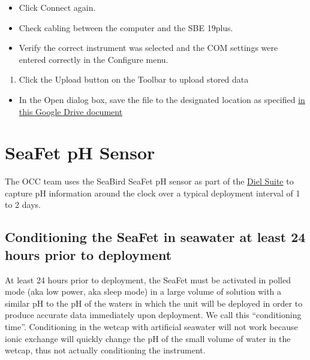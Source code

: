 \documentclass[]{book}
\providecommand{\tightlist}{%
  \setlength{\itemsep}{0pt}\setlength{\parskip}{0pt}}
\begin{document}
\begin{itemize}
\tightlist
\item
  Click Connect again.
\item
  Check cabling between the computer and the SBE 19plus.
\item
  Verify the correct instrument was selected and the COM settings were
  entered correctly in the Configure menu.
\end{itemize}

\begin{enumerate}
\def\labelenumi{\arabic{enumi}.}
\setcounter{enumi}{4}
\tightlist
\item
  Click the Upload button on the Toolbar to upload stored data
\end{enumerate}

\begin{itemize}
\tightlist
\item
  In the Open dialog box, save the file to the designated location as
  specified
  \href{https://drive.google.com/drive/folders/1WcZclgRCLHNOXykYigSZviiwFEH02lKx}{in
  this Google Drive document}
\end{itemize}

\chapter{SeaFet pH Sensor}\label{seafet-ph-sensor}

The OCC team uses the SeaBird SeaFet pH sensor as part of the
\protect\hyperlink{dielsuite}{Diel Suite} to capture pH information
around the clock over a typical deployment interval of 1 to 2 days.

\section{Conditioning the SeaFet in seawater at least 24 hours prior to
deployment}\label{conditioning-the-seafet-in-seawater-at-least-24-hours-prior-to-deployment}

At least 24 hours prior to deployment, the SeaFet must be activated in
polled mode (aka low power, aka sleep mode) in a large volume of
solution with a similar pH to the pH of the waters in which the unit
will be deployed in order to produce accurate data immediately upon
deployment. We call this ``conditioning time''. Conditioning in the
wetcap with artificial seawater will not work because ionic exchange
will quickly change the pH of the small volume of water in the wetcap,
thus not actually conditioning the instrument.
\end{document}
